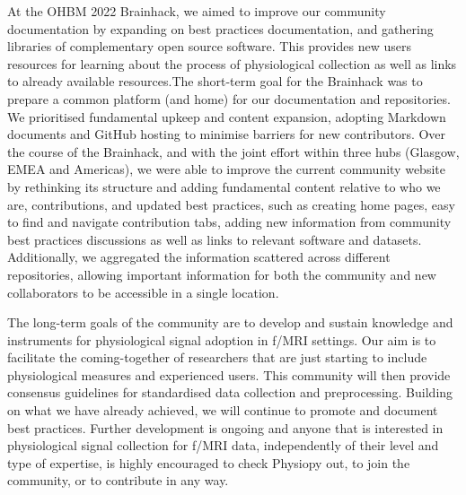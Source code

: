 \documentclass[../main.tex]{subfiles}
\begin{document}
At the OHBM 2022 Brainhack, we aimed to improve our community documentation by expanding on best practices documentation, and gathering libraries of complementary open source software. This provides new users resources for learning about the process of physiological collection as well as links to already available resources.The short-term goal for the Brainhack was to prepare a common platform (and home) for our documentation and repositories. We prioritised fundamental upkeep and content expansion, adopting Markdown documents and GitHub hosting to minimise barriers for new contributors. Over the course of the Brainhack, and with the joint effort within three hubs (Glasgow, EMEA and Americas), we were able to improve the current community website by rethinking its structure and adding fundamental content relative to who we are, contributions, and updated best practices, such as creating home pages, easy to find and navigate contribution tabs, adding new information from community best practices discussions as well as links to relevant software and datasets. Additionally, we  aggregated the information scattered across different repositories, allowing important information for both the community and new collaborators to be accessible in a single location. 

The long-term goals of the community are to develop and sustain knowledge and instruments for physiological signal adoption in f/MRI settings. Our aim is to facilitate the coming-together of researchers that are just starting to include physiological measures and experienced users. This community will then provide consensus guidelines for standardised data collection and preprocessing. Building on what we have already achieved, we will continue to promote and document best practices. Further development is ongoing and anyone that is interested in physiological signal collection for f/MRI data, independently of their level and type of expertise, is highly encouraged to check Physiopy out, to join the community, or to contribute in any way.


\printbibliography
\end{document}

